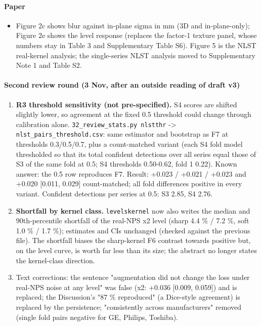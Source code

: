 \paragraph*{Paper}
\begin{itemize}
\item Figure 2c shows blur against in-plane sigma in mm (3D and in-plane-only); Figure 2e shows the level response (replaces the factor-1 texture panel, whose numbers stay in Table 3 and Supplementary Table S6). Figure 5 is the NLST real-kernel analysis; the single-series NLST analysis moved to Supplementary Note 1 and Table S2.
\end{itemize}

\paragraph*{Second review round (3 Nov, after an outside reading of draft v3)}
\begin{enumerate}[start=4]
\item \textbf{R3 threshold sensitivity (not pre-specified).} S4 scores are shifted slightly lower, so agreement at the fixed 0.5 threshold could change through calibration alone. \texttt{32\_review\_stats.py nlstthr} -\textgreater{} \texttt{nlst\_pairs\_threshold.csv}: same estimator and bootstrap as F7 at thresholds 0.3/0.5/0.7, plus a count-matched variant (each S4 fold model thresholded so that its total confident detections over all series equal those of S3 of the same fold at 0.5; S4 thresholds 0.50-0.62, fold 1 0.22). Known answer: the 0.5 row reproduces F7. Result: +0.023 / +0.021 / +0.023 and +0.020 [0.011, 0.029] count-matched; all fold differences positive in every variant. Confident detections per series at 0.5: S3 2.85, S4 2.76.
\item \textbf{Shortfall by kernel class.} \texttt{levelskernel} now also writes the median and 90th-percentile shortfall of the real-NPS x2 level (sharp 4.4 \% / 7.2 \%, soft 1.0 \% / 1.7 \%); estimates and CIs unchanged (checked against the previous file). The shortfall biases the sharp-kernel F6 contrast towards positive but, on the level curve, is worth far less than its size; the abstract no longer states the kernel-class direction.
\item Text corrections: the sentence "augmentation did not change the loss under real-NPS noise at any level" was false (x2: +0.036 [0.009, 0.059]) and is replaced; the Discussion's "87 \% reproduced" (a Dice-style agreement) is replaced by the persistence; "consistently across manufacturers" removed (single fold pairs negative for GE, Philips, Toshiba).
\end{enumerate}

